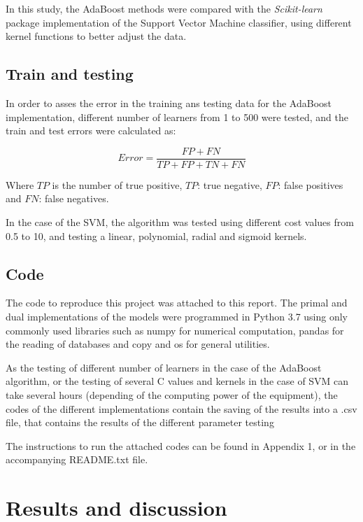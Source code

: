 \documentclass[11pt,twocolumn,letterpaper]{article}
\begin{document}
In this study, the AdaBoost methods were compared with the \textit{Scikit-learn} package implementation of the Support Vector Machine classifier, using different kernel functions to better adjust the data.

\subsection{Train and testing}

In order to asses the error in the training ans testing data for the AdaBoost implementation, different number of learners from 1 to 500 were tested, and the train and test errors were calculated as:

\begin{equation}
	Error = \frac{FP+FN}{TP+FP+TN+FN}
\end{equation}

Where $TP$ is the number of true positive, $TP$: true negative, $FP$: false positives and $FN$: false negatives.

In the case of the SVM, the algorithm was tested using different cost values from 0.5 to 10, and testing a linear, polynomial, radial and sigmoid kernels.

\subsection{Code}

The code to reproduce this project was attached to this report. The primal and dual implementations of the models were programmed in Python 3.7 using only commonly used libraries such as numpy for numerical computation, pandas for the reading of databases and copy and os for general utilities.

As the  testing of different number of learners in the case of the AdaBoost algorithm, or the testing of several C values and kernels in the case of SVM can take several hours (depending of the computing power of the equipment), the codes of the different implementations contain the saving of the results into a .csv file, that contains the results of the different parameter testing

The instructions to run the attached codes can be found in Appendix 1, or in the accompanying README.txt file.

\section{Results and discussion}
\end{document}

